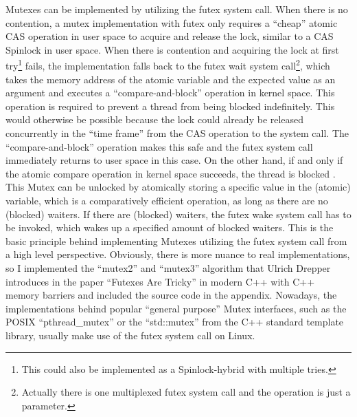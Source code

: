 Mutexes can be implemented by utilizing the futex system call. When there is no contention, a mutex implementation with futex only requires a “cheap” atomic CAS operation in user space to acquire and release the lock, similar to a CAS Spinlock in user space. When there is contention and acquiring the lock at first try\footnote{This could also be implemented as a Spinlock-hybrid with multiple tries.} fails, the implementation falls back to the futex wait system call\footnote{Actually there is one multiplexed futex system call and the operation is just a parameter.}, which takes the memory address of the atomic variable and the expected value as an argument and executes a “compare-and-block” operation in kernel space. This operation is required to prevent a thread from being blocked indefinitely. This would otherwise be possible because the lock could already be released concurrently in the “time frame” from the CAS operation to the system call. The “compare-and-block” operation makes this safe and the futex system call immediately returns to user space in this case. On the other hand, if and only if the atomic compare operation in kernel space succeeds, the thread is blocked \cite{man:futex}.\newline
This Mutex can be unlocked by atomically storing a specific value in the (atomic) variable, which is a comparatively efficient operation, as long as there are no (blocked) waiters. If there are (blocked) waiters, the futex wake system call has to be invoked, which wakes up a specified amount of blocked waiters.\newline
This is the basic principle behind implementing Mutexes utilizing the futex system call from a high level perspective. Obviously, there is more nuance to real implementations, so I implemented the “mutex2” and “mutex3” algorithm that Ulrich Drepper introduces in the paper “Futexes Are Tricky” \cite{drepper:futex} in modern C++ with C++ memory barriers and included the source code in the appendix.\newline
Nowadays, the implementations behind popular “general purpose” Mutex interfaces, such as the POSIX “pthread\_mutex” or the “std::mutex” from the C++ standard template library, usually make use of the futex system call on Linux.
